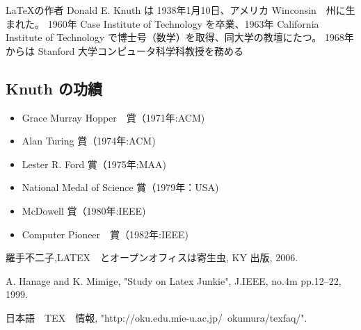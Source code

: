 \documentclass[a4j]{article}
\begin{document}
\LaTeX の作者 Donald E. Knuth は 1938年1月10日、アメリカ Winconsin　州に生まれた。
1960年 Case Institute of Technology を卒業、1963年 California Institute of Technology で博士号（数学）を取得、同大学の教壇にたつ。
1968年からは Stanford 大学コンピュータ科学科教授を務める\cite{W3TEX}

\subsection{Knuth の功績}

\begin{itemize}
\item Grace Murray Hopper　賞（1971年:ACM)

\item Alan Turing 賞（1974年:ACM)

\item Lester R. Ford 賞（1975年:MAA)

\item National Medal of Science 賞（1979年：USA)

\item McDowell 賞（1980年:IEEE)

\item Computer Pioneer　賞（1982年:IEEE)
\end{itemize}

\begin{thebibliography}{99}

羅手不二子,LATEX　とオープンオフィスは寄生虫, KY 出版, 2006.

A. Hanage and K. Mimige, "Study on Latex Junkie", J.IEEE, no.4m pp.12--22, 1999.

日本語　TEX　情報, "http://oku.edu.mie-u.ac.jp/~okumura/texfaq/".

\end{thebibliography}
\end{document}
